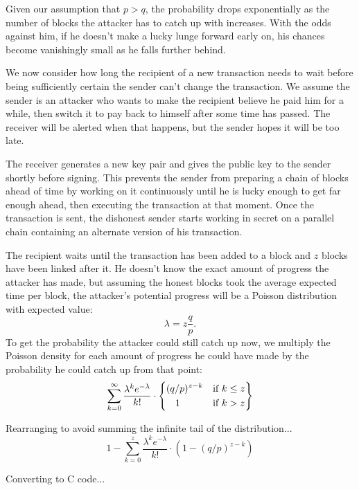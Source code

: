 \documentclass{article}
\begin{document}
Given our assumption that $p > q$, the probability drops exponentially as the number of blocks the attacker has to catch up with increases. With the odds against him, if he doesn't make a lucky lunge forward early on, his chances become vanishingly small as he falls further behind.

We now consider how long the recipient of a new transaction needs to wait before being sufficiently certain the sender can't change the transaction. We assume the sender is an attacker who wants to make the recipient believe he paid him for a while, then switch it to pay back to himself after some time has passed. The receiver will be alerted when that happens, but the sender hopes it will be too late.

The receiver generates a new key pair and gives the public key to the sender shortly before signing. This prevents the sender from preparing a chain of blocks ahead of time by working on it continuously until he is lucky enough to get far enough ahead, then executing the transaction at that moment. Once the transaction is sent, the dishonest sender starts working in secret on a parallel chain containing an alternate version of his transaction.

The recipient waits until the transaction has been added to a block and $z$ blocks have been linked after it. He doesn't know the exact amount of progress the attacker has made, but assuming the honest blocks took the average expected time per block, the attacker's potential progress will be a Poisson distribution with expected value: \[ \lambda = z \frac{q}{p}. \]
To get the probability the attacker could still catch up now, we multiply the Poisson density for each amount of progress he could have made by the probability he could catch up from that point:
\[
    \sum_{k = 0}^{\infty} {
        \frac{\lambda^k e^{-\lambda}}{k!} \cdot
        \left\{\begin{aligned}
                &           (q/p)^{z-k} & \text{if } k \le z \\
        & \makebox[\widthof{(q/p)}]{1}  & \text{if } k > z
        \end{aligned}\right\}
    }
\]

Rearranging to avoid summing the infinite tail of the distribution...
\[
    1 - \sum_{k = 0}^{z} {
        \frac{\lambda^k e^{-\lambda}}{k!} \cdot \left(1 - (q / p)^{z-k} \right)
    }
\]

Converting to C code...
    
    \inputminted{c}{code/10-attacker-probability.c}
\end{document}
